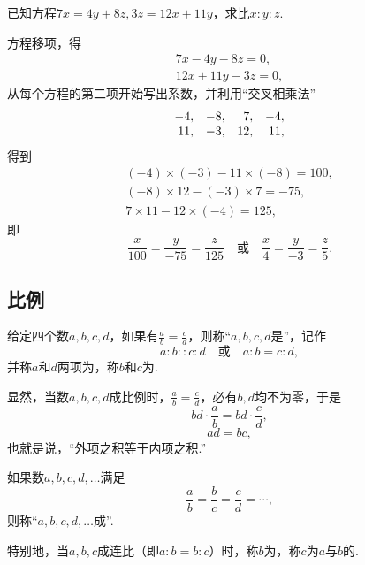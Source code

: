 \begin{example}
已知方程\(7x=4y+8z, 3z=12x+11y\)，求比\(x:y:z\).
\begin{solution}
方程移项，得\begin{gather*}
7x-4y-8z=0, \\
12x+11y-3z=0,
\end{gather*}
从每个方程的第二项开始写出系数，并利用“交叉相乘法”
\[
\begin{array}{*4r}
-4, & -8, & 7, & -4, \\
11, & -3, & 12, & 11,
\end{array}
\]得到\begin{gather*}
(-4)\times(-3)-11\times(-8)=100, \\
(-8)\times12-(-3)\times7=-75, \\
7\times11-12\times(-4)=125,
\end{gather*}即\[
\frac{x}{100}=\frac{y}{-75}=\frac{z}{125}
\quad\text{或}\quad
\frac{x}{4}=\frac{y}{-3}=\frac{z}{5}.
\]
\end{solution}
\end{example}

\subsection{比例}
\begin{definition}
给定四个数\(a,b,c,d\)，如果有\(\frac{a}{b}=\frac{c}{d}\)，则称“\(a,b,c,d\)是”，记作\[
a:b :: c:d
\quad\text{或}\quad
a:b = c:d,
\]并称\(a\)和\(d\)两项为，称\(b\)和\(c\)为.
\end{definition}

显然，当数\(a,b,c,d\)成比例时，\(\frac{a}{b}=\frac{c}{d}\)，必有\(b,d\)均不为零，于是\[
bd \cdot \frac{a}{b} = bd \cdot \frac{c}{d},
\]\[
ad = bc,
\]也就是说，“外项之积等于内项之积.”

\begin{definition}
如果数\(a,b,c,d,\dotsc\)满足\[
\frac{a}{b} = \frac{b}{c} = \frac{c}{d} = \dotsb,
\]则称“\(a,b,c,d,\dotsc\)成”.

特别地，当\(a,b,c\)成连比（即\(a:b = b:c\)）时，称\(b\)为，称\(c\)为\(a\)与\(b\)的.
\end{definition}


